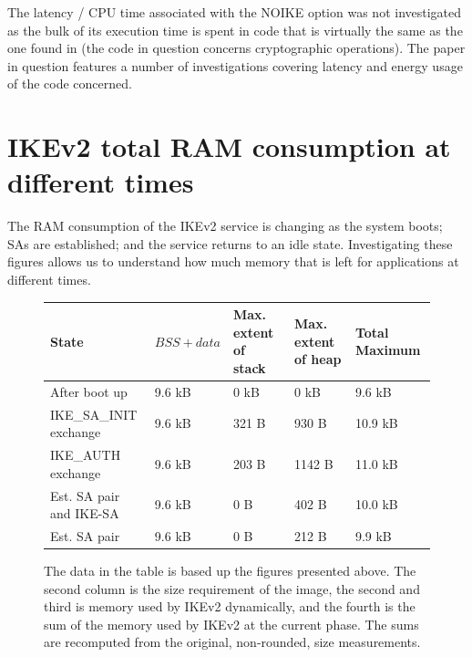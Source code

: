 \documentclass[final,a4paper,twoside,11pt,onecolumn]{report}
\begin{document}
The latency / CPU time associated with the NOIKE option was not investigated as the bulk of its execution time is spent in code  that is virtually the same as the one found in \cite{raza11securing} (the code in question concerns cryptographic operations). The paper in question features a number of investigations covering latency and energy usage of the code concerned.


\section{IKEv2 total RAM consumption at different times}
\label{sec:eval-sum}
The RAM consumption of the IKEv2 service is changing as the system boots; SAs are established; and the service returns to an idle state. Investigating these figures allows us to understand how much memory that is left for applications at different times.

\begin{figure}[h]
\centering
\begin{tabular}{ p{2.25cm} | l | p{2.25cm} | p{2.25cm} | p{2.25cm} }                        
State                   & $BSS + data$ & Max. extent of stack  & Max. extent of heap   & Total Maximum  \\ \hline
After boot up           & 9.6 kB       & 0 kB                  & 0 kB                  & 9.6 kB       \\
IKE\_SA\_INIT exchange  & 9.6 kB       & 321 B                 & 930 B                 & 10.9 kB      \\
IKE\_AUTH exchange      & 9.6 kB       & 203 B                 & 1142 B                & 11.0 kB      \\
Est. SA pair and IKE-SA & 9.6 kB       & 0 B                   & 402 B                 & 10.0 kB      \\
Est. SA pair            & 9.6 kB       & 0 B                   & 212 B                 & 9.9 kB
\end{tabular}
\caption{The data in the table is based up the figures presented above. The second column is the size requirement of the image, the second and third is memory used by IKEv2 dynamically, and the fourth is the sum of the memory used by IKEv2 at the current phase. The sums are recomputed from the original, non-rounded, size measurements.}
\end{figure}
\end{document}
